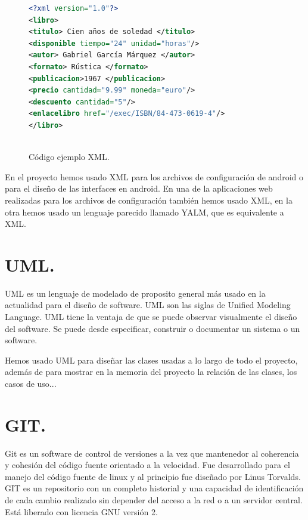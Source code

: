 \begin{figure}
\begin{small}
 \begin{center}

    
  \begin{lstlisting}[language=XML]   
<?xml version="1.0"?>
<libro>
<titulo> Cien años de soledad </titulo>
<disponible tiempo="24" unidad="horas"/>
<autor> Gabriel García Márquez </autor>
<formato> Rústica </formato>
<publicacion>1967 </publicacion>
<precio cantidad="9.99" moneda="euro"/>
<descuento cantidad="5"/>
<enlacelibro href="/exec/ISBN/84-473-0619-4"/>
</libro>
    
  \end{lstlisting}

\end{center}
\end{small}
  
  \caption{Código ejemplo XML.}
  \label{cod:XML}
\end{figure}

En el proyecto hemos usado XML para los archivos de configuración de android o para el diseño de las interfaces en android. En una de la aplicaciones web realizadas para los archivos de configuración también hemos usado XML, en la otra hemos usado un lenguaje parecido llamado YALM, que es equivalente a XML.

\section{UML.}

UML es un lenguaje de modelado de proposito general más usado en la actualidad para el diseño de software. UML son las siglas de Unified Modeling Language. UML tiene la ventaja de que se puede observar visualmente el diseño del software. Se puede desde especificar, construir o documentar un sistema o un software.


Hemos usado UML para diseñar las clases usadas a lo largo de todo el proyecto, además de para mostrar en la memoria del proyecto la relación de las clases, los casos de uso...

\section{GIT.}

Git es un software de control de versiones a la vez que mantenedor al coherencia y cohesión del código fuente orientado a la velocidad. Fue desarrollado para el manejo del código fuente de linux y al principio fue diseñado por Linus Torvalds. GIT es un repositorio con un completo historial y una capacidad de identificación de cada cambio realizado sin depender del acceso a la red o a un servidor central. Está liberado con licencia GNU versión 2.

